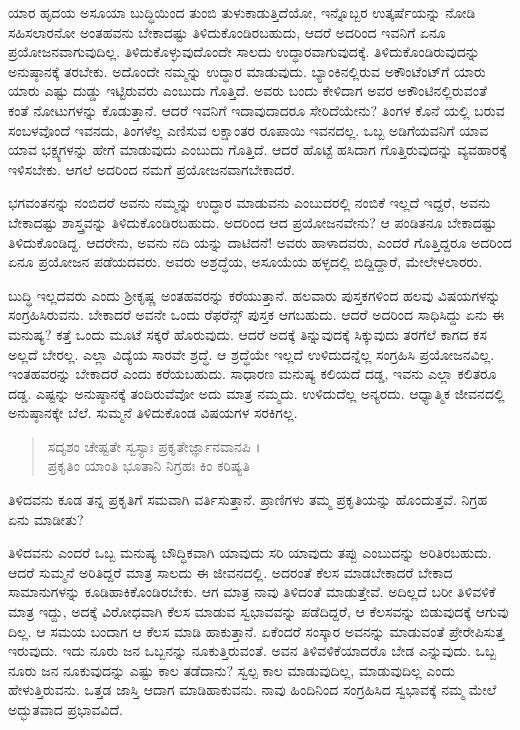 ಯಾರ ಹೃದಯ ಅಸೂಯಾ ಬುದ್ಧಿಯಿಂದ ತುಂಬಿ ತುಳುಕಾಡುತ್ತಿದೆಯೋ, ಇನ್ನೊಬ್ಬರ ಉತ್ಕರ್ಷೆಯನ್ನು ನೋಡಿ ಸಹಿಸಲಾರನೋ ಅಂತಹವನು ಬೇಕಾದಷ್ಟು ತಿಳಿದುಕೊಂಡಿರಬಹುದು, ಆದರೆ ಅದರಿಂದ ಇವನಿಗೆ ಏನೂ ಪ್ರಯೋಜನವಾಗುವುದಿಲ್ಲ. ತಿಳಿದುಕೊಳ್ಳುವುದೊಂದೇ ಸಾಲದು ಉದ್ಧಾರವಾಗುವುದಕ್ಕೆ. ತಿಳಿದುಕೊಂಡಿರುವುದನ್ನು ಅನುಷ್ಠಾನಕ್ಕೆ ತರಬೇಕು. ಅದೊಂದೇ ನಮ್ಮನ್ನು ಉದ್ಧಾರ ಮಾಡುವುದು. ಬ್ಯಾಂಕಿನಲ್ಲಿರುವ ಅಕೌಂಟೆಂಟ್​ಗೆ ಯಾರು ಯಾರು ಎಷ್ಟು ದುಡ್ಡು ಇಟ್ಟಿರುವರು ಎಂಬುದು ಗೊತ್ತಿದೆ. ಅವರು ಬಂದು ಕೇಳಿದಾಗ ಅವರ ಅಕೌಂಟಿನಲ್ಲಿರುವಂತೆ ಕಂತೆ ನೋಟುಗಳನ್ನು ಕೊಡುತ್ತಾನೆ. ಆದರೆ ಇವನಿಗೆ ಇದಾವುದಾದರೂ ಸೇರಿದೆಯೇನು? ತಿಂಗಳ ಕೊನೆ ಯಲ್ಲಿ ಬರುವ ಸಂಬಳವೊಂದೆ ಇವನದು, ತಿಂಗಳೆಲ್ಲ ಎಣಿಸುವ ಲಕ್ಷಾಂತರ ರೂಪಾಯಿ ಇವನದಲ್ಲ. ಒಬ್ಬ ಅಡಿಗೆಯವನಿಗೆ ಯಾವ ಯಾವ ಭಕ್ಷ್ಯಗಳನ್ನು ಹೇಗೆ ಮಾಡುವುದು ಎಂಬುದು ಗೊತ್ತಿದೆ. ಆದರೆ ಹೊಟ್ಟೆ ಹಸಿದಾಗ ಗೊತ್ತಿರುವುದನ್ನು ವ್ಯವಹಾರಕ್ಕೆ ಇಳಿಸಬೇಕು. ಆಗಲೆ ಅದರಿಂದ ನಮಗೆ ಪ್ರಯೋಜನವಾಗಬೇಕಾದರೆ.

ಭಗವಂತನನ್ನು ನಂಬಿದರೆ ಅವನು ನಮ್ಮನ್ನು ಉದ್ಧಾರ ಮಾಡುವನು ಎಂಬುದರಲ್ಲಿ ನಂಬಿಕೆ ಇಲ್ಲದೆ ಇದ್ದರೆ, ಅವನು ಬೇಕಾದಷ್ಟು ಶಾಸ್ತ್ರವನ್ನು ತಿಳಿದುಕೊಂಡಿರಬಹುದು. ಅದರಿಂದ ಆದ ಪ್ರಯೋಜನವೇನು? ಆ ಪಂಡಿತನೂ ಬೇಕಾದಷ್ಟು ತಿಳಿದುಕೊಂಡಿದ್ದ. ಆದರೇನು, ಅವನು ನದಿ ಯನ್ನು ದಾಟಿದನೆ! ಅವರು ಹಾಳಾದವರು, ಎಂದರೆ ಗೊತ್ತಿದ್ದರೂ ಅದರಿಂದ ಏನೂ ಪ್ರಯೋಜನ ಪಡೆಯದವರು. ಅವರು ಅಶ್ರದ್ಧೆಯ, ಅಸೂಯೆಯ ಹಳ್ಳದಲ್ಲಿ ಬಿದ್ದಿದ್ದಾರೆ, ಮೇಲೇಳಲಾರರು.

ಬುದ್ಧಿ ಇಲ್ಲದವರು ಎಂದು ಶ್ರೀಕೃಷ್ಣ ಅಂತಹವರನ್ನು ಕರೆಯುತ್ತಾನೆ. ಹಲವಾರು ಪುಸ್ತಕಗಳಿಂದ ಹಲವು ವಿಷಯಗಳನ್ನು ಸಂಗ್ರಹಿಸಿರುವನು. ಬೇಕಾದರೆ ಅವನೇ ಒಂದು ರೆಫರೆನ್ಸ್ ಪುಸ್ತಕ ಆಗಬಹುದು. ಆದರೆ ಅದರಿಂದ ಸಾಧಿಸಿದ್ದು ಏನು ಈ ಮನುಷ್ಯ? ಕತ್ತೆ ಒಂದು ಮೂಟೆ ಸಕ್ಕರೆ ಹೊರುವುದು. ಆದರೆ ಅದಕ್ಕೆ ತಿನ್ನುವುದಕ್ಕೆ ಸಿಕ್ಕುವುದು ತರಗೆಲೆ ಕಾಗದ ಕಸ ಅಲ್ಲದೆ ಬೇರಲ್ಲ. ಎಲ್ಲಾ ವಿದ್ಯೆಯ ಸಾರವೇ ಶ್ರದ್ಧೆ. ಆ ಶ್ರದ್ಧೆಯೇ ಇಲ್ಲದೆ ಉಳಿದುದನ್ನೆಲ್ಲ ಸಂಗ್ರಹಿಸಿ ಪ್ರಯೋಜನವಿಲ್ಲ. ಇಂತಹವರನ್ನು ಬೇಕಾದರೆ  ಎಂದು ಕರೆಯಬಹುದು. ಸಾಧಾರಣ ಮನುಷ್ಯ ಕಲಿಯದೆ ದಡ್ಡ, ಇವನು ಎಲ್ಲಾ ಕಲಿತರೂ ದಡ್ಡ. ಎಷ್ಟನ್ನು ಅನುಷ್ಠಾನಕ್ಕೆ ತಂದಿರುವೆವೋ ಅದು ಮಾತ್ರ ನಮ್ಮದು. ಉಳಿದುದೆಲ್ಲ ಅನ್ಯರದು. ಆಧ್ಯಾತ್ಮಿಕ ಜೀವನದಲ್ಲಿ ಅನುಷ್ಠಾನಕ್ಕೇ ಬೆಲೆ. ಸುಮ್ಮನೆ ತಿಳಿದುಕೊಂಡ ವಿಷಯಗಳ ಸರಕಿಗಲ್ಲ.

\begin{verse}
ಸದೃಶಂ ಚೇಷ್ಟತೇ ಸ್ವಸ್ಯಾಃ ಪ್ರಕೃತೇರ್ಜ್ಞಾನವಾನಪಿ ।\\ಪ್ರಕೃತಿಂ ಯಾಂತಿ ಭೂತಾನಿ ನಿಗ್ರಹಃ ಕಿಂ ಕರಿಷ್ಯತಿ 
\end{verse}

{\small ತಿಳಿದವನು ಕೂಡ ತನ್ನ ಪ್ರಕೃತಿಗೆ ಸಮವಾಗಿ ವರ್ತಿಸುತ್ತಾನೆ. ಪ್ರಾಣಿಗಳು ತಮ್ಮ ಪ್ರಕೃತಿಯನ್ನು ಹೊಂದುತ್ತವೆ. ನಿಗ್ರಹ ಏನು ಮಾಡೀತು?}

ತಿಳಿದವನು ಎಂದರೆ ಒಬ್ಬ ಮನುಷ್ಯ ಬೌದ್ಧಿಕವಾಗಿ ಯಾವುದು ಸರಿ ಯಾವುದು ತಪ್ಪು ಎಂಬುದನ್ನು ಅರಿತಿರಬಹುದು. ಆದರೆ ಸುಮ್ಮನೆ ಅರಿತಿದ್ದರೆ ಮಾತ್ರ ಸಾಲದು ಈ ಜೀವನದಲ್ಲಿ. ಅದರಂತೆ ಕೆಲಸ ಮಾಡಬೇಕಾದರೆ ಬೇಕಾದ ಸಾಮಾನುಗಳನ್ನು ಕೂಡಿಹಾಕಿಕೊಂಡಿರಬೇಕು. ಆಗ ಮಾತ್ರ ನಾವು ತಿಳಿದಂತೆ ಮಾಡುತ್ತೇವೆ. ಅದಿಲ್ಲದೆ ಬರೀ ತಿಳಿವಳಿಕೆ ಮಾತ್ರ ಇದ್ದು, ಅದಕ್ಕೆ ವಿರೋಧವಾಗಿ ಕೆಲಸ ಮಾಡುವ ಸ್ವಭಾವವನ್ನು ಪಡೆದಿದ್ದರೆ, ಆ ಕೆಲಸವನ್ನು ಬಿಡುವುದಕ್ಕೆ ಆಗುವು ದಿಲ್ಲ. ಆ ಸಮಯ ಬಂದಾಗ ಆ ಕೆಲಸ ಮಾಡಿ ಹಾಕುತ್ತಾನೆ. ಏಕೆಂದರೆ ಸಂಸ್ಕಾರ ಅವನನ್ನು ಮಾಡುವಂತೆ ಪ್ರೇರೇಪಿಸುತ್ತ ಇರುವುದು. ಇದು ನೂರು ಜನ ಒಬ್ಬನನ್ನು ನೂಕುತ್ತಿರುವಂತೆ. ಅವನ ತಿಳಿವಳಿಕೆಯಾದರೊ ಬೇಡ ಎನ್ನುವುದು. ಒಬ್ಬ ನೂರು ಜನ ನೂಕುವುದನ್ನು ಎಷ್ಟು ಕಾಲ ತಡೆದಾನು? ಸ್ವಲ್ಪ ಕಾಲ ಮಾಡುವುದಿಲ್ಲ, ಮಾಡುವುದಿಲ್ಲ ಎಂದು ಹೇಳುತ್ತಿರುವನು. ಒತ್ತಡ ಜಾಸ್ತಿ ಆದಾಗ ಮಾಡಿಹಾಕುವನು. ನಾವು ಹಿಂದಿನಿಂದ ಸಂಗ್ರಹಿಸಿದ ಸ್ವಭಾವಕ್ಕೆ ನಮ್ಮ ಮೇಲೆ ಅದ್ಭುತವಾದ ಪ್ರಭಾವವಿದೆ.


